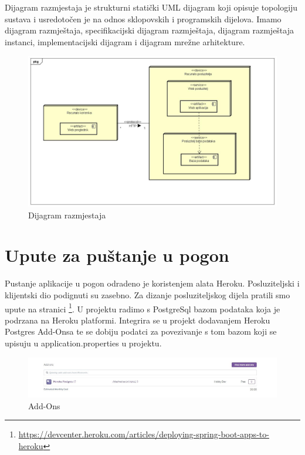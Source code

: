 		Dijagram razmjestaja je strukturni statički UML dijagram koji opisuje topologiju sustava i usredotočen je na odnos sklopovskih i programskih dijelova.
		Imamo dijagram razmještaja, specifikacijski dijagram razmještaja, dijagram razmještaja instanci, implementacijski dijagram i dijagram mrežne arhitekture.
			
			\begin{figure}[H]
				
				\includegraphics[width=\textwidth]{slike/Deployment Diagram0.jpg} %
				\centering
				\caption{Dijagram razmjestaja}
				\label{fig:dijagramraz}
			\end{figure}
			\eject 
		
		\section{Upute za puštanje u pogon}
		
		Pustanje aplikacije u pogon odradeno je koristenjem alata Heroku. Posluziteljski i klijentski dio podignuti su zasebno. Za dizanje posluziteljskog dijela pratili smo upute na stranici \footnote{\url{ https://devcenter.heroku.com/articles/deploying-spring-boot-apps-to-heroku}}.
		U projektu radimo s PostgreSql bazom podataka koja je podrzana na Heroku platformi. Integrira se u projekt dodavanjem Heroku Postgres Add-Onsa te se dobiju podatci za povezivanje s tom bazom koji se upisuju u application.properties u projektu.
		
		\begin{figure}[H]
			
			\includegraphics[width=\textwidth]{slike/prva.jpg} %
			\centering
			\caption{Add-Ons}
			\label{fig:addons}
		\end{figure}
	

